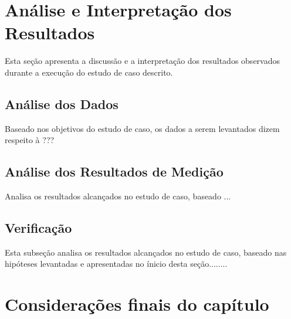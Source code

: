 \section{Análise e Interpretação dos Resultados}

Esta seção apresenta a discussão e a interpretação dos resultados observados durante a execução do estudo de caso descrito.

\subsection{Análise dos Dados}

Baseado nos objetivos do estudo de caso, os dados a serem levantados dizem respeito à ???

\subsection{Análise dos Resultados de Medição}

Analisa os resultados alcançados no estudo de caso, baseado ...

\subsection{Verificação}

Esta subseção analisa os resultados alcançados no estudo de caso, baseado nas hipóteses levantadas e apresentadas no ínicio desta seção........


\section{Considerações finais do capítulo}








